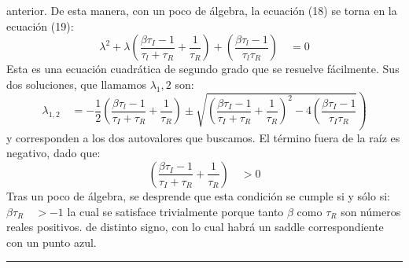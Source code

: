 \documentclass[twocolumn,aps,prl]{revtex4-1}
\newcommand*\sepline{%
  \begin{center}
    \rule[1ex]{.5\textwidth}{.5pt}
  \end{center}}
\begin{document}
anterior. De esta manera, con un poco de álgebra, la ecuación (18) se torna en la ecuación (19):
$$
\lambda^{2}+\lambda\left(\frac{\beta \tau_{I}-1}{\tau_{l}+\tau_{R}}+\frac{1}{\tau_{R}}\right)+\left(\frac{\beta \tau_{l}-1}{\tau_{l} \tau_{R}}\right) \quad=0
$$
Esta es una ecuación cuadrática de segundo grado que se resuelve fácilmente. Sus dos soluciones, que llamamos $\lambda_{1}, 2$ son:
$$
\left.\lambda_{1,2} \quad=-\frac{1}{2}\left(\frac{\beta \tau_{l}-1}{\tau_{I}+\tau_{R}}+\frac{1}{\tau_{R}}\right) \pm \sqrt{\left(\frac{\beta \tau_{I}-1}{\tau_{I}+\tau_{R}}+\frac{1}{\tau_{R}}\right)^{2}-4\left(\frac{\beta \tau_{I}-1}{\tau_{I} \tau_{R}}\right.}\right)
$$
y corresponden a los dos autovalores que buscamos. El término fuera de la raíz es negativo, dado que:
$$
\left(\frac{\beta \tau_{I}-1}{\tau_{I}+\tau_{R}}+\frac{1}{\tau_{R}}\right) \quad>0
$$
Tras un poco de álgebra, se desprende que esta condición se cumple si y sólo si:
$\beta \tau_{R} \quad>-1$
la cual se satisface trivialmente porque tanto $\beta$ como $\tau_{R}$ son números reales positivos.
de distinto signo, con lo cual habrá un saddle
correspondiente con un punto azul.

\sepline
\end{document}
